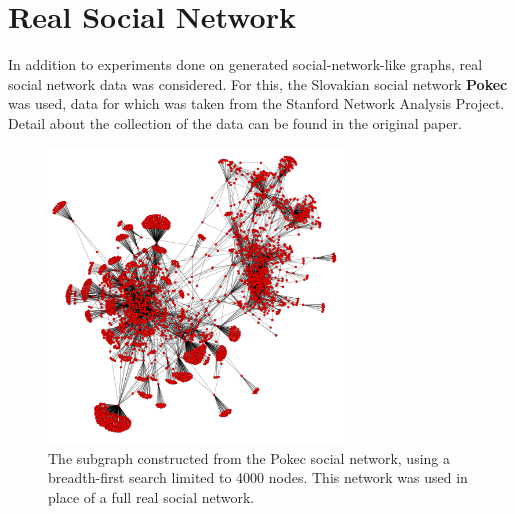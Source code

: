 \documentclass[bsc,frontabs,twoside,singlespacing,parskip,deptreport]{infthesis}     %
\begin{document}
\section{Real Social Network} \label{sec:real_social_network}
In addition to experiments done on generated social-network-like graphs, real social network data was considered. For this, the Slovakian social network \textbf{Pokec} was used, data for which was taken from the Stanford Network Analysis Project\cite{snapnets}. Detail about the collection of the data can be found in the original paper\cite{pokecsource}.

\begin{figure}
  \centering
    \includegraphics[width=0.7\textwidth]{pokec_4000}
  \caption{The subgraph constructed from the Pokec social network, using a breadth-first search limited to 4000 nodes. This network was used in place of a full real social network.}
  \label{fig:pokec_4000}
\end{figure}
\end{document}
